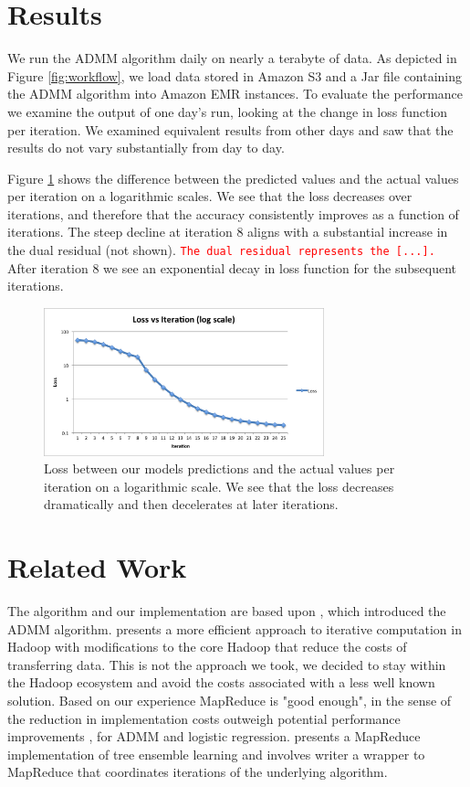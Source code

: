 \documentclass[10pt, conference, compsocconf]{IEEEtran}
\newcommand{\todo}[1]{\texttt{\textcolor{red}{#1}}}
\begin{document}
\section{Results}\label{sec:results}
We run the ADMM algorithm daily on nearly a terabyte of data.  As depicted in Figure \ref{fig:workflow}, we load data stored in Amazon S3 and a Jar file containing the ADMM algorithm into Amazon EMR instances.  To evaluate the performance we examine the output of one day's run, looking at the change in loss function per iteration.  We examined equivalent results from other days and saw that the results do not vary substantially from day to day.

Figure \ref{fig:iter} shows the difference between the predicted values and the actual values per iteration on a logarithmic scales.  We see that the loss decreases over iterations, and therefore that the accuracy consistently improves as a function of iterations.  The steep decline at iteration 8 aligns with a substantial increase in the dual residual (not shown).  \todo{The dual residual represents the [...].} After iteration 8 we see an exponential decay in loss function for the subsequent iterations.

\begin{figure}[!t]
\centering
\includegraphics[width=3.2in]{iter_rnorm_plot}
\caption{Loss between our models predictions and the actual values per iteration on a logarithmic scale.  We see that the loss decreases dramatically and then decelerates at later iterations.}
\label{fig:iter}
\end{figure}

\section{Related Work}\label{sec:related}
The algorithm and our implementation are based upon \cite{boyd}, which introduced the ADMM algorithm.  \cite{bu2010} presents a more efficient approach to iterative computation in Hadoop with modifications to the core Hadoop that reduce the costs of transferring data.  This is not the approach we took, we decided to stay within the Hadoop ecosystem and avoid the costs associated with a less well known solution.  Based on our experience MapReduce is "good enough", in the sense of the reduction in implementation costs outweigh potential performance improvements \cite{lin2012}, for ADMM and logistic regression. \cite{planet} presents a MapReduce implementation of tree ensemble learning and involves writer a wrapper to MapReduce that coordinates iterations of the underlying algorithm.
\end{document}
